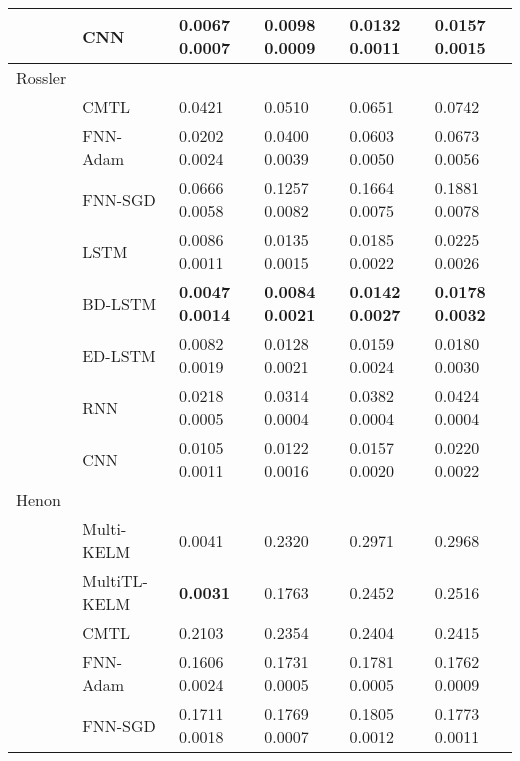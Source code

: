 \documentclass{ieeeaccess}
\begin{document}
\begin{table*}[htbp!]
\begin{tabular}{llllll}
&CNN &  	0.0067	0.0007    	&  0.0098	0.0009      &0.0132	0.0011	       &0.0157	0.0015\\
\hline



 
Rossler &    	  &	& \\

&CMTL \cite{chandra2017CMTLMulti} & 0.0421   & 0.0510  &0.0651	& 0.0742 	   \\


&FNN-Adam & 0.0202	0.0024     	&  0.0400	0.0039      &0.0603	0.0050	       &0.0673	0.0056\\

&FNN-SGD  &  0.0666	0.0058    	& 0.1257	0.0082       &0.1664	0.0075	       &0.1881	0.0078\\

&LSTM   &  0.0086	0.0011    	&  0.0135	0.0015      &0.0185	0.0022	       &0.0225	0.0026\\

&BD-LSTM   &  \textbf{0.0047	0.0014}    	& \textbf{ 0.0084	0.0021 }     &	\textbf{0.0142	0.0027 }      &\textbf{0.0178	0.0032}\\

&ED-LSTM   &  0.0082	0.0019    	&   0.0128	0.0021     &0.0159	0.0024	       &0.0180	0.0030\\

&RNN  &    0.0218	0.0005  	&   0.0314	0.0004     &0.0382	0.0004	       &0.0424	0.0004\\

&CNN & 0.0105		0.0011     	&  0.0122		0.0016      &	0.0157		0.0020	       &	0.0220		0.0022\\
\hline


 
 
 
 

 
 
Henon &    	  & 	& \\
&Multi-KELM\cite{YE2019227}&0.0041&	0.2320&	0.2971&	0.2968\\
&MultiTL-KELM\cite{YE2019227}&	 \textbf{0.0031}&	0.1763&0.2452&	0.2516\\
&CMTL \cite{chandra2017CMTLMulti} & 0.2103   & 0.2354  &0.2404	   & 0.2415 \\


&FNN-Adam &  0.1606   0.0024     	&0.1731   0.0005         &	0.1781   0.0005        & 0.1762   0.0009\\

&FNN-SGD  & 0.1711    0.0018     	&  0.1769    0.0007      &0.1805    0.0012	       &0.1773    0.0011\\


\end{tabular}
\end{table*}
\end{document}
